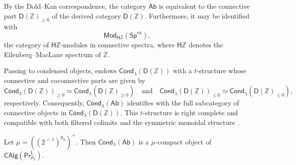 By the Dold--Kan correspondence, the category $\mathsf{Ab}$ is equivalent to the connective part $\mathsf{D}(\mathbb{Z})_{\geq 0}$ of the derived category $\mathsf{D}(\mathbb{Z})$. Furthermore, it may be identified with
\[\mathsf{Mod}_{\mathsf{H}\mathbb{Z}}(\mathsf{Sp}^{\mathrm{cn}}),\]
the category of $\mathsf{H}\mathbb{Z}$-modules in connective spectra, where $\mathsf{H}\mathbb{Z}$ denotes the Eilenberg--MacLane spectrum of $\mathbb{Z}$.

Passing to condensed objects, \cite[Thm.~1.2.(2)]{standardtstructures} endows $\mathsf{Cond}_{\lambda}(\mathsf{D}(\mathbb{Z}))$ with a $t$\nobreakdash-structure whose connective and coconnective parts are given by
\[\mathsf{Cond}_{\lambda}(\mathsf{D}(\mathbb{Z}))_{\geq 0}\simeq \mathsf{Cond}_{\lambda}(\mathsf{D}(\mathbb{Z})_{\geq 0}) \quad \text{and}\quad \mathsf{Cond}_{\lambda}(\mathsf{D}(\mathbb{Z}))_{\leq 0}\simeq \mathsf{Cond}_{\lambda}(\mathsf{D}(\mathbb{Z})_{\leq 0}),\]
respectively. Consequently, $\mathsf{Cond}_{\lambda}(\mathsf{Ab})$ identifies with the full subcategory of connective objects in $\mathsf{Cond}_{\lambda}(\mathsf{D}(\mathbb{Z}))$. This $t$-structure is right complete and compatible with both filtered colimits and the symmetric monoidal structure \cite[Prop.~3.8]{standardtstructures}.

\begin{proposition}\label{CondAb is mu-compact}
    Let $\mu=((2^{<\lambda})^{\aleph_0})^+$. Then $\mathsf{Cond}_\lambda(\mathsf{Ab})$ is a $\mu$-compact object of $\mathsf{CAlg}(\mathsf{Pr}^\mathsf{L}_{\aleph_1})$.
\end{proposition}


